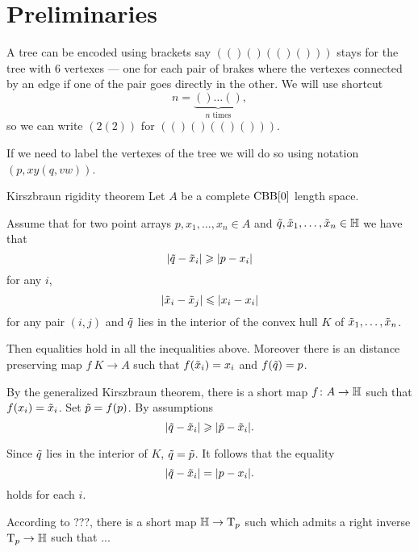\section{Preliminaries}

A tree can be encoded using brackets say $(()()(()()))$ stays for the tree with 6 vertexes --- one for each pair of brakes where the vertexes connected by an edge if one of the pair goes directly in the other.
We will use shortcut
\[n=\underbrace{()\dots()}_{n\text{ times}},\]
so we can write $(2(2))$ for $(()()(()()))$.

If we need to label the vertexes of the tree we will do so using notation $(p,xy(q,vw))$.

\begin{thm}{Kirszbraun rigidity theorem}\label{thm:kirszbraun-rigid}
Let $A$ be a complete $\CBB[0]$ length space.

Assume that for two point arrays $p,x_1,\dots,x_n\in A$ and $\~q, \~x_1,\dots,\~x_n\in \HH$ we have that 
\[|\~q-\~x_i|\ge |p-x_i|\]
for any $i$,
\[|\~x_i-\~x_j|\le |x_i-x_i|\]
for any pair $(i,j)$
and $\~q$ lies in the interior of the convex hull $K$ of $\~x_1,\dots,\~x_n$.

Then equalities hold in all the inequalities above.
Moreover there is an distance preserving map $f\:K\to A$ such that $f(\~x_i)=x_i$ and $f(\~q)=p$. 
\end{thm}

By the generalized Kirszbraun theorem, there is a short map $f\:A\to \HH$
such that $f(x_i)=\~x_i$.
Set  $\~p=f(p)$.
By assumptions
\[|\~q-\~x_i|\ge |\~p-\~x_i|.\]

Since $\~q$ lies in the interior of $K$, $\~q=\~p$.
It follows that the equality 
\[|\~q-\~x_i|= |p-x_i|.\]
holds for each $i$.

According to ???, there is a short map $\HH\to \T_p$ such which admits a right inverse $\T_p\to \HH$ such that ...



\qeds